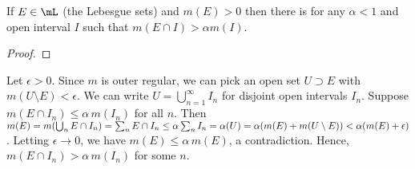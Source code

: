 \documentclass{article}
\begin{document}
 If $E \in \mL$ (the Lebesgue sets) and $m(E) > 0$ then there is for any $\alpha < 1$ and open interval $I$ such that $m(E \cap I) > \alpha m(I)$.
\begin{proof}
\end{proof} 
Let $\epsilon > 0$. Since $m$ is outer regular, we can pick an open set $U \supset E$ with $m(U \setminus E) < \epsilon$. We can write $U = \bigcup_{n=1}^\infty I_n$ for disjoint open intervals $I_n$.  Suppose $m(E \cap I_n) \le \alpha \,m(I_n)$ for all $n$.  Then $m(E) = m(\bigcup_n E \cap I_n) = 
\sum_n E \cap I_n \le \alpha \sum_n I_n = \alpha (U) = \alpha(m(E) + m(U\setminus E)) < \alpha(m(E) + \epsilon)$. Letting $\epsilon \to 0$, we have $m(E) \le \alpha \,m(E)$, a contradiction. Hence, $m(E \cap I_n) > \alpha \, m(I_n)$ for some $n$.
\end{document}
